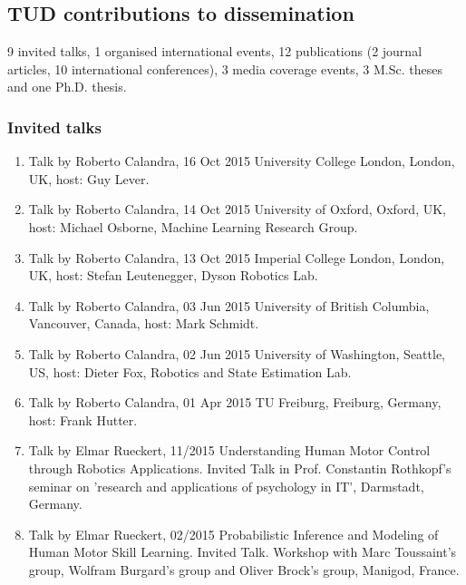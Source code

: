\subsection{TUD contributions to dissemination}

9 invited talks, 1 organised international events, 12 publications (2 journal articles, 10 international conferences), 3 media coverage events, 3 M.Sc. theses and one Ph.D. thesis. 

\subsubsection{Invited talks}

\begin{enumerate}

\item Talk by Roberto Calandra, 16 Oct 2015 University College London, London, UK, host: Guy Lever.
\item Talk by Roberto Calandra, 14 Oct 2015 University of Oxford, Oxford, UK, host: Michael Osborne, Machine Learning Research Group.
\item Talk by Roberto Calandra, 13 Oct 2015 Imperial College London, London, UK, host: Stefan Leutenegger, Dyson Robotics Lab.
\item Talk by Roberto Calandra, 03 Jun 2015 University of British Columbia, Vancouver, Canada, host: Mark Schmidt.
\item Talk by Roberto Calandra, 02 Jun 2015 University of Washington, Seattle, US, host: Dieter Fox, Robotics and State Estimation Lab.
\item Talk by Roberto Calandra, 01 Apr 2015 TU Freiburg, Freiburg, Germany, host: Frank Hutter.

\item Talk by Elmar Rueckert, 11/2015 Understanding Human Motor Control through Robotics Applications. Invited Talk in Prof. Constantin Rothkopf’s seminar on ’research and applications of psychology in IT’, Darmstadt, Germany.
\item Talk by Elmar Rueckert, 02/2015 Probabilistic Inference and Modeling of Human Motor Skill Learning. Invited Talk. Workshop with Marc Toussaint’s group, Wolfram Burgard’s group and Oliver Brock’s group, Manigod, France.


\end{enumerate}
